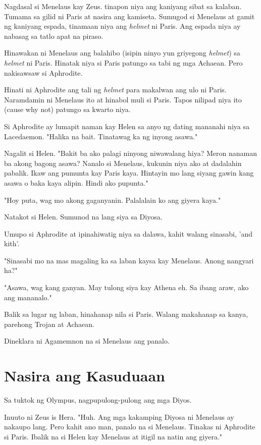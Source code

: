 \documentclass[12pt,letterpaper]{report}
\begin{document}
Nagdasal si Menelaus kay Zeus. tinapon niya ang kaniyang sibat sa kalaban. Tumama sa gilid ni Paris at nasira ang kamiseta.
Sumugod si Menelaus at gamit ng kaniyang espada, tinamaan niya ang \textit{helmet} ni Paris.
Ang espada niya ay nabasag sa tatlo apat na piraso.

Hinawakan ni Menelaus ang balahibo (isipin ninyo yun griyegong \textit{helmet}) sa \textit{helmet} ni Paris.
Hinatak niya si Paris patungo sa tabi ng mga Achaean. Pero nakisawsaw si Aphrodite.

Hinati ni Aphrodite ang tali ng \textit{helmet} para makalwan ang ulo ni Paris. Naramdamin ni Menelaus ito at hinabol muli si Paris.
Tapos nilipad niya ito (cause why not) patungo sa kwarto niya.

Si Aphrodite ay lumapit naman kay Helen sa anyo ng dating mananahi niya sa Lacedaemon. "Halika na bait.
Tinatawag ka ng inyong asawa."

Nagalit si Helen. "Bakit ba ako palagi ninyong niwawalang hiya? Meron nanaman ba akong bagong asawa?
Nanalo si Menelaus, kukunin niya ako at dadalahin pabalik. Ikaw ang pumunta kay Paris kaya.
Hintayin mo lang siyang gawin kang asawa o baka kaya alipin. Hindi ako pupunta."

"Hoy puta, wag mo akong gaganyanin. Palalalain ko ang giyera kaya."

Natakot si Helen. Sumunod na lang siya sa Diyosa.

Umupo si Aphrodite at ipinahiwatig niya sa dalawa, kahit walang sinasabi, 'and kith'.

"Sinasabi mo na mas magaling ka sa laban kaysa kay Menelaus. Anong nangyari ha?"

"Asawa, wag kang ganyan. May tulong siya kay Athena eh. Sa ibang araw, ako ang mananalo."

Balik sa lugar ng laban, hinahanap nila si Paris. Walang makahanap sa kanya, parehong Trojan at Achaean.

Dineklara ni Agamemnon na si Menelaus ang panalo.


\pagebreak
\chapter{Nasira ang Kasuduaan}
Sa tuktok ng Olympus, nagpupulong-pulong ang mga Diyos.

Inuuto ni Zeus is Hera. "Huh. Ang mga kakamping Diyosa ni Menelaus ay nakaupo lang.
Pero kahit ano man, panalo na si Menelaus. Tinakas ni Aphrodite si Paris.
Ibalik na si Helen kay Menelaus at itigil na natin ang giyera."
\end{document}
